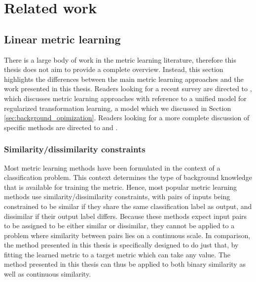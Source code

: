 \section{Related work}

\quad


\subsection{Linear metric learning}

There is a large body of work in the metric learning literature, therefore this thesis does not aim to provide a complete overview. Instead, this section highlights the differences between the main metric learning approaches and the work presented in this thesis. Readers looking for a recent survey are directed to \cite{kulis2012metric}, which discusses metric learning approaches with reference to a unified model for regularized transformation learning, a model which we discussed in Section \ref{sec:background_opimization}. Readers looking for a more complete discussion of specific methods are directed to \cite{bellet2013survey} and \cite{yang2006distance}.


\subsubsection{Similarity/dissimilarity constraints}

Most metric learning methods have been formulated in the context of a classification problem. This context determines the type of background knowledge that is available for training the metric. Hence, most popular metric learning methods use similarity/dissimilarity constraints, with pairs of inputs being constrained to be similar if they share the same classification label as output, and dissimilar if their output label differs. \cite{davis2007information, guillaumin2009you, kostinger2012large} Because these methods expect input pairs to be assigned to be either similar or dissimilar, they cannot be applied to a problem where similarity between pairs lies on a continuous scale. In comparison, the method presented in this thesis is specifically designed to do just that, by fitting the learned metric to a target metric which can take any value. The method presented in this thesis can thus be applied to both binary similarity as well as continuous similarity.


